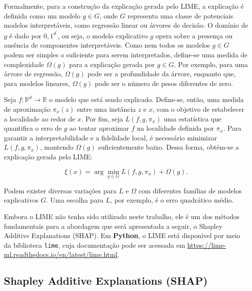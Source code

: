 \documentclass[
  12pt,
  a4paper,
]{scrreprt}
\begin{document}
\vspace{12pt}

Formalmente, para a construção da explicação gerada pelo LIME, a
explicação é definida como um modelo \(g \in G\), onde \(G\) representa
uma classe de potenciais modelos interpretáveis, como regressão linear
ou árvores de decisão. O domínio de \(g\) é dado por \({0, 1}^{d^{'}}\),
ou seja, o modelo explicativo \(g\) opera sobre a presença ou ausência
de componentes interpretáveis. Como nem todos os modelos \(g \in G\)
podem ser simples o suficiente para serem interpretados, define-se uma
medida de complexidade \(\Omega\left(g\right)\) para a explicação gerada
por \(g \in G\). Por exemplo, para uma árvore de regressão,
\(\Omega\left(g\right)\) pode ser a profundidade da árvore, enquanto
que, para modelos lineares, \(\Omega\left(g\right)\) pode ser o número
de pesos diferentes de zero.

\vspace{12pt}

Seja \(f: \mathbb{R}^d \rightarrow \mathbb{R}\) o modelo que está sendo
explicado. Define-se, então, uma medida de aproximação
\(\pi_x\left(z\right)\) entre uma instância \(z\) e \(x\), com o
objetivo de estabelecer a localidade ao redor de \(x\). Por fim, seja
\(L\left(f, g, \pi_x\right)\) uma estatística que quantifica o erro de
\(g\) ao tentar aproximar \(f\) na localidade definida por \(\pi_x\).
Para garantir a interpretabilidade e a fidelidade local, é necessário
minimizar \(L(f, g, \pi_x)\), mantendo \(\Omega(g)\) suficientemente
baixo. Dessa forma, obtém-se a explicação gerada pelo LIME:

\[
\xi\left(x\right) = \arg \min_{g \in G} L\left(f, g, \pi_x\right) + \Omega\left(g\right)\text{.}
\]

Podem exister diversas variações para \(L\) e \(\Omega\) com diferentes
famílias de modelos explicativos \(G\). Uma escolha para \(L\), por
exemplo, é o erro quadrático médio.

\vspace{12pt}

Embora o LIME não tenha sido utilizado neste trabalho, ele é um dos
métodos fundamentais para a abordagem que será apresentada a seguir, o
Shapley Additive Explanations (SHAP). Em \textbf{Python}, o LIME está
disponível por meio da biblioteca \texttt{lime}, cuja documentação pode
ser acessada em
\url{https://lime-ml.readthedocs.io/en/latest/lime.html}.

\subsection{Shapley Additive Explanations
(SHAP)}\label{shapley-additive-explanations-shap}
\end{document}
